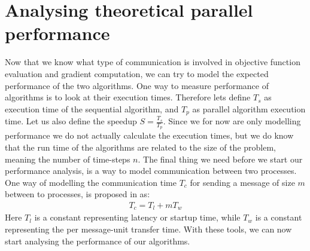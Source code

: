 \section{Analysing theoretical parallel performance} \label{analysis sec}
Now that we know what type of communication is involved in objective function evaluation and gradient computation, we can try to model the expected performance of the two algorithms. One way to measure performance of algorithms is to look at their execution times. Therefore lets define $T_s$ as execution time of the sequential algorithm, and $T_p$ as parallel algorithm execution time. Let us also define the speedup $S=\frac{T_s}{T_p}$. Since we for now are only modelling performance we do not actually calculate the execution times, but we do know that the run time of the algorithms are related to the size of the problem, meaning the number of time-steps $n$. The final thing we need before we start our performance analysis, is a way to model communication between two processes. One way of modelling the communication time $T_c$ for sending a message of size $m$ between to processes, is proposed in \cite{grama2003introduction} as:
\begin{align*}
T_c = T_l + mT_w
\end{align*} 
Here $T_l$ is a constant representing latency or startup time, while $T_w$ is a constant representing the per message-unit transfer time. With these tools, we can now start analysing the performance of our algorithms.
